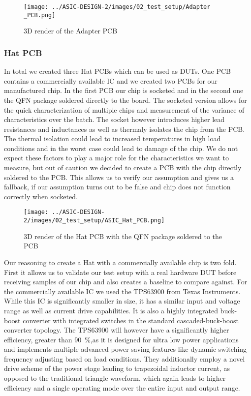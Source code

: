 \begin{figure}[h]
    \centering
    \texttt{[image: ../ASIC-DESIGN-2/images/02\_test\_setup/Adapter \_PCB.png]}
    \caption{3D render of the Adapter PCB}
    \label{fig:Adapter_PCB}
\end{figure}



\subsubsection{Hat PCB}
In total we created three Hat PCBs which can be used as \ac{DUT}s. One PCB contains a commercially available IC and we created two PCBs for our manufactured chip. In the first PCB our chip is socketed and in the second one the QFN package soldered directly to the board. The socketed version allows for the quick characterization of multiple chips and measurement of the variance of characteristics over the batch. The socket however introduces higher lead resistances and inductances as well as thermaly isolates the chip from the PCB. The thermal isolation could lead to increased temperatures in high load conditions and in the worst case could lead to damage of the chip. We do not expect these factors to play a major role for the characteristics we want to measure, but out of caution we decided to create a PCB with the chip directly soldered to the PCB. This allows us to verify our assumption and gives us a fallback, if our assumption turns out to be false and chip does not function correctly when socketed.\\

\begin{figure}[h]
    \centering
    \texttt{[image: ../ASIC-DESIGN-2/images/02\_test\_setup/ASIC\_Hat\_PCB.png]}
    \caption{3D render of the Hat PCB with the QFN package soldered to the PCB}
    \label{fig:ASIC_Hat}
\end{figure}


Our reasoning to create a Hat with a commercially available chip is two fold. First it allows us to validate our test setup with a real hardware \ac{DUT} before receiving samples of our chip and also creates a baseline to compare against. For the commercially available \ac{IC} we used the TPS63900 from Texas Instruments. While this \ac{IC} is significantly smaller in size, it has a similar input and voltage range as well as current drive capabilities. It is also a highly integrated buck-boost converter with integrated switches in the standard cascaded-buck-boost converter topology. The TPS63900 will however have a significantly higher efficiency, greater than \qty{90}{\percent},as it is designed for ultra low power applications and implements multiple advanced power saving features like dynamic switching frequency adjusting based on load conditions\cite{tps63900}. They additionally employ a novel drive scheme of the power stage leading to trapezoidal inductor current, as opposed to the traditional triangle waveform, which again leads to higher efficiency and a single operating mode over the entire input and output range\cite{tps63900}. 